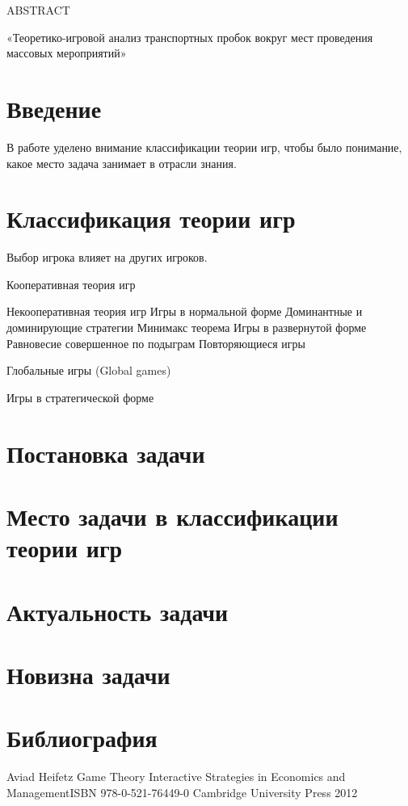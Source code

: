 \documentclass{article}
\author{Егор Кузьмичев}
\begin{document}
ABSTRACT


«Теоретико-игровой анализ транспортных пробок вокруг мест проведения массовых мероприятий»



\section{Введение}

В работе уделено внимание классификации теории игр, чтобы было понимание, какое место задача занимает в отрасли знания.

\section{Классификация теории игр}

Выбор игрока влияет на других игроков.



Кооперативная теория игр

Некооперативная теория игр
Игры в нормальной форме
Доминантные и доминирующие стратегии
Минимакс теорема
Игры в развернутой форме
Равновесие совершенное по подыграм
Повторяющиеся игры

Глобальные игры (Global games)

Игры в стратегической форме


\section{Постановка задачи}

\section{Место задачи в классификации теории игр}

\section{Актуальность задачи}

\section{Новизна задачи}

\section{Библиография}

Aviad Heifetz Game Theory Interactive Strategies in Economics and ManagementISBN 978-0-521-76449-0 Cambridge University Press 2012
\end{document}
